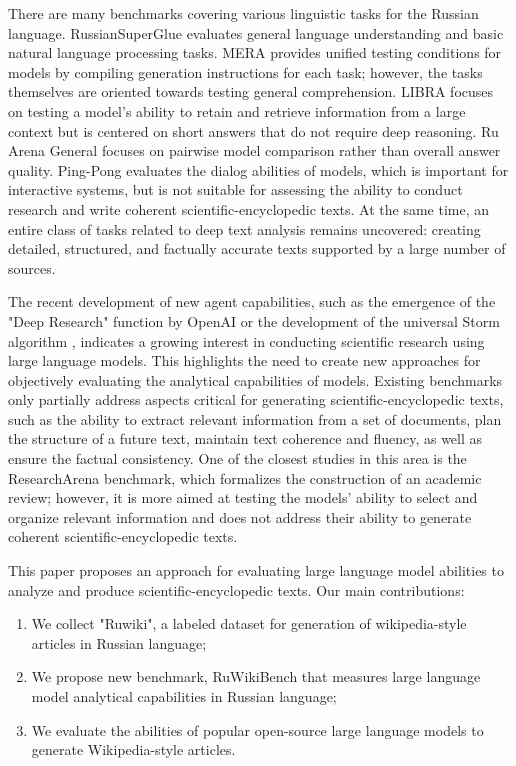 \documentclass{superfri}
\begin{document}
There are many benchmarks covering various linguistic tasks for the Russian language. 
RussianSuperGlue \cite{rsglue} evaluates general language understanding and basic natural language processing tasks. 
MERA \cite{mera} provides unified testing conditions for models by compiling generation instructions for each task; however, the tasks themselves are oriented towards testing general comprehension. 
LIBRA \cite{libra} focuses on testing a model's ability to retain and retrieve information from a large context but is centered on short answers that do not require deep reasoning. 
Ru Arena General \cite{arena} focuses on pairwise model comparison rather than overall answer quality. 
Ping-Pong \cite{pp} evaluates the dialog abilities of models, which is important for interactive systems, 
but is not suitable for assessing the ability to conduct research and write coherent scientific-encyclopedic texts. 
At the same time, an entire class of tasks related to deep text analysis remains uncovered: creating detailed, structured, and factually accurate texts supported by a large number of sources.

The recent development of new agent capabilities, such as the emergence of the "Deep Research" function by OpenAI \cite{deepr} or the development of the universal Storm algorithm \cite{storm}, 
indicates a growing interest in conducting scientific research using large language models. 
This highlights the need to create new approaches for objectively evaluating the analytical capabilities of models. 
Existing benchmarks only partially address aspects critical for generating scientific-encyclopedic texts, 
such as the ability to extract relevant information from a set of documents, plan the structure of a future text, 
maintain text coherence and fluency, as well as ensure the factual consistency. One of the closest studies in this area is the ResearchArena \cite{resar} benchmark, 
which formalizes the construction of an academic review; however, it is more aimed at testing the models' ability 
to select and organize relevant information and does not address their ability to generate coherent scientific-encyclopedic texts.

This paper proposes an approach for evaluating large language model abilities to analyze and produce scientific-encyclopedic texts.
Our main contributions:
\begin{enumerate}
\item We collect "Ruwiki", a labeled dataset for generation of wikipedia-style articles in Russian language;
\item We propose new benchmark, RuWikiBench that measures large language model analytical capabilities in Russian language;
\item We evaluate the abilities of popular open-source large language models to generate Wikipedia-style articles.
\end{enumerate}
\end{document}
